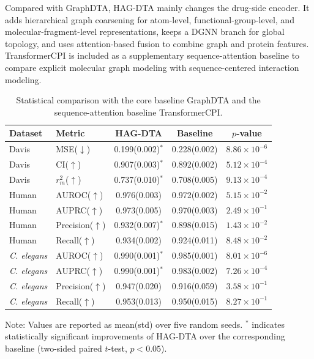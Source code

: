 \documentclass[pdflatex,sn-mathphys-num]{sn-jnl}%
\theoremstyle{thmstyleone}%
\theoremstyle{thmstyletwo}%
\theoremstyle{thmstylethree}%
\begin{document}
Compared with GraphDTA, HAG-DTA mainly changes the drug-side encoder. It adds hierarchical graph coarsening for atom-level, functional-group-level, and molecular-fragment-level representations, keeps a DGNN branch for global topology, and uses attention-based fusion to combine graph and protein features. TransformerCPI\cite{chen2020transformercpi} is included as a supplementary sequence-attention baseline to compare explicit molecular graph modeling with sequence-centered interaction modeling.
\begin{table}[ht]
\caption{Statistical comparison with the core baseline GraphDTA and the sequence-attention baseline TransformerCPI.\label{tab:baseline_significance}}
\tabcolsep=0pt
\begin{tabular*}{\textwidth}{@{\extracolsep{\fill}}llccc@{}}
\toprule
Dataset & Metric & HAG-DTA & Baseline & $p$-value \\
\midrule
Davis & MSE($\downarrow$) & 0.199(0.002)$^{*}$ & 0.228(0.002) & $8.86\times10^{-6}$ \\
Davis & CI($\uparrow$) & 0.907(0.003)$^{*}$ & 0.892(0.002) & $5.12\times10^{-4}$ \\
Davis & $r_m^2$($\uparrow$) & 0.737(0.010)$^{*}$ & 0.708(0.005) & $9.13\times10^{-4}$ \\
Human & AUROC($\uparrow$) & 0.976(0.003) & 0.972(0.002) & $5.15\times10^{-2}$ \\
Human & AUPRC($\uparrow$) & 0.973(0.005) & 0.970(0.003) & $2.49\times10^{-1}$ \\
Human & Precision($\uparrow$) & 0.932(0.007)$^{*}$ & 0.898(0.015) & $1.43\times10^{-2}$ \\
Human & Recall($\uparrow$) & 0.934(0.002) & 0.924(0.011) & $8.48\times10^{-2}$ \\
\textit{C. elegans} & AUROC($\uparrow$) & 0.990(0.001)$^{*}$ & 0.985(0.001) & $8.01\times10^{-6}$ \\
\textit{C. elegans} & AUPRC($\uparrow$) & 0.990(0.001)$^{*}$ & 0.983(0.002) & $7.26\times10^{-4}$ \\
\textit{C. elegans} & Precision($\uparrow$) & 0.947(0.020) & 0.916(0.059) & $3.58\times10^{-1}$ \\
\textit{C. elegans} & Recall($\uparrow$) & 0.953(0.013) & 0.950(0.015) & $8.27\times10^{-1}$ \\
\bottomrule
\end{tabular*}
\begin{tablenotes}
\item Note: Values are reported as mean(std) over five random seeds. $^{*}$ indicates statistically significant improvements of HAG-DTA over the corresponding baseline (two-sided paired $t$-test, $p<0.05$).
\end{tablenotes}
\end{table}
\end{document}
